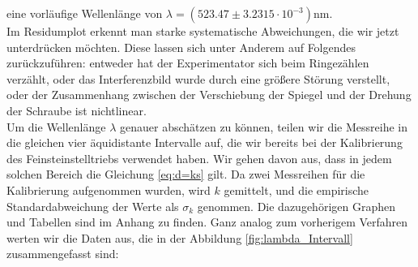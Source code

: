 \documentclass[12pt,a4paper]{article}
\begin{document}
eine vorläufige Wellenlänge von $\lambda=(523.47\pm3.2315\cdot10^{-3})$nm.\\
Im Residumplot erkennt man starke systematische Abweichungen, die wir jetzt unterdrücken möchten. Diese lassen sich unter Anderem auf Folgendes zurückzuführen: entweder hat der Experimentator sich beim Ringezählen verzählt, oder das Interferenzbild wurde durch eine größere Störung verstellt, oder der Zusammenhang zwischen der Verschiebung der Spiegel und der Drehung der Schraube ist nichtlinear.\\
Um die Wellenlänge $\lambda$ genauer abschätzen zu können, teilen wir die Messreihe in die gleichen vier äquidistante Intervalle auf, die wir bereits bei der Kalibrierung des Feinsteinstelltriebs verwendet haben. Wir gehen davon aus, dass in jedem solchen Bereich die Gleichung \ref{eq:d=ks} gilt. Da zwei Messreihen für die Kalibrierung aufgenommen wurden, wird $k$ gemittelt, und die empirische Standardabweichung der Werte als $\sigma_{k}$ genommen. Die dazugehörigen Graphen und Tabellen sind im Anhang zu finden. Ganz analog zum vorherigem Verfahren werten wir die Daten aus, die in der Abbildung \ref{fig:lambda_Intervall} zusammengefasst sind:
\begin{figure}[H]
	\centering
	\qquad
	\label{}
\end{figure}
\end{document}

